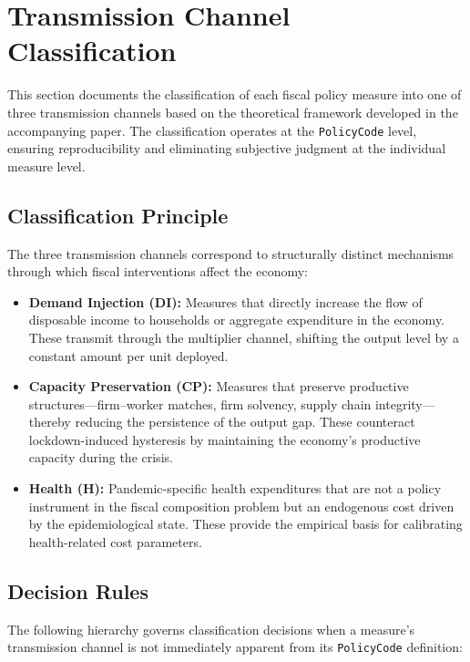 \documentclass[12pt]{article}
\begin{document}
\newpage
\section{Transmission Channel Classification}
\label{sec:transmission_channels}

This section documents the classification of each fiscal policy measure into one of three transmission channels based on the theoretical framework developed in the accompanying paper. The classification operates at the \texttt{PolicyCode} level, ensuring reproducibility and eliminating subjective judgment at the individual measure level.

\subsection{Classification Principle}

The three transmission channels correspond to structurally distinct mechanisms through which fiscal interventions affect the economy:

\begin{itemize}
  \item \textbf{Demand Injection (DI):} Measures that directly increase the flow of disposable income to households or aggregate expenditure in the economy. These transmit through the multiplier channel, shifting the output level by a constant amount per unit deployed.
  \item \textbf{Capacity Preservation (CP):} Measures that preserve productive structures---firm--worker matches, firm solvency, supply chain integrity---thereby reducing the persistence of the output gap. These counteract lockdown-induced hysteresis by maintaining the economy's productive capacity during the crisis.
  \item \textbf{Health (H):} Pandemic-specific health expenditures that are not a policy instrument in the fiscal composition problem but an endogenous cost driven by the epidemiological state. These provide the empirical basis for calibrating health-related cost parameters.
\end{itemize}

\subsection{Decision Rules}

The following hierarchy governs classification decisions when a measure's transmission channel is not immediately apparent from its \texttt{PolicyCode} definition:
\end{document}
